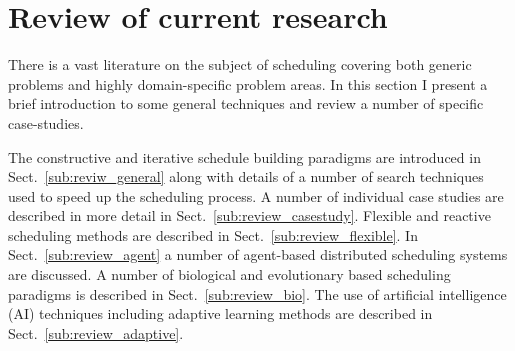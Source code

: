 \section{Review of current research}
\label{sect:review}










There is a vast literature on the subject of scheduling covering both generic problems and highly domain-specific problem areas. In this section I present a brief introduction to some general techniques and review a number of specific case-studies. 

The constructive and iterative schedule building paradigms are introduced in Sect.~\ref{sub:reviw_general} along with details of a number of search techniques used to speed up the scheduling process. A number of individual case studies are described in more detail in Sect.~\ref{sub:review_casestudy}. Flexible and reactive scheduling methods are described in Sect.~\ref{sub:review_flexible}. In Sect.~\ref{sub:review_agent} a number of agent-based distributed scheduling systems are discussed.  A number of biological and evolutionary based scheduling paradigms is described in Sect.~\ref{sub:review_bio}. The use of artificial intelligence (AI) techniques including adaptive learning methods are described in Sect.~\ref{sub:review_adaptive}. 


